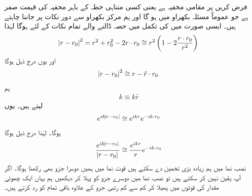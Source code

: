 فرض کریں  پر  مقامی مخفیہ ہے یعنی کسی متناہی خطہ کے باہر مخفیہ کی قیمت صفر ہے جو عموماً مسئلہ بکھراو میں ہو گا اور ہم مرکز بکھراو سے دور نکات پر  جاننا چاہتے ہیں۔ ایسی صورت میں  کی تکمل میں حصہ ڈالنے والے تمام نکات کے لئے  ہوگا لہٰذا
\begin{align}
	\abs{r-r_0}^2 = r^2+r_0^2-2r\cdot r_0 \cong r^2\left(1-2\frac{r\cdot r_0}{r^2}\right)
\end{align}
اور یوں درج ذیل ہوگا
\begin{align}
	\abs{r-r_0}^2\cong r-\hat{r}\cdot r_0
\end{align}
ہم 
\begin{align}
	k\equiv k\hat{r}
\end{align}
لیتے ہیں۔ یوں
\begin{align}
	e^{ik\abs{r-r_0}}\cong e^{ikr}e^{-ik\cdot r_0}
\end{align}
ہوگا۔ لہٰذا درج ذیل ہوگا 
\begin{align}
	\frac{e^{ik\abs{r-r_0}}}{\abs{r-r_0}}\cong\frac{e^{ikr}}{r}e^{-ik\cdot r_0}
\end{align}
نصب نما میں ہم زیادہ بڑی تخمین  دے سکتے ہیں قوت نما میں ہمیں دوسرا جزو بھی رکھنا ہوگا۔ اگر آپ یقین نہیں کر سکتے ہیں تو نصب نما میں دوسرے جزو کو پہلا کر دیکھیں ہم یہاں ایک چھوٹی مقدار  کی قوتوں میں پھیلا کر کم سے کم رتبی جزو کے علاوہ باقی تمام کو رد کرتے ہیں۔

